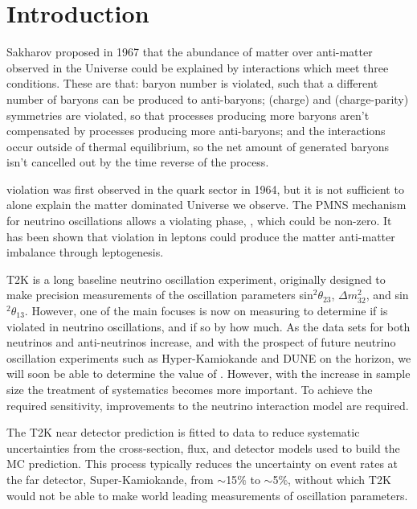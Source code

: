 \chapter{Introduction} \label{sec:introductions}

Sakharov proposed in 1967\cite{sakharov} that the abundance of matter over anti-matter observed in the Universe could be explained by interactions which meet three conditions. These are that: baryon number is violated, such that a different number of baryons can be produced to anti-baryons; \C (charge) and \CP (charge-parity) symmetries are violated, so that processes producing more baryons aren't compensated by processes producing more anti-baryons; and the interactions occur outside of thermal equilibrium, so the net amount of generated baryons isn't cancelled out by the time reverse of the process. 

\CP violation was first observed in the quark sector in 1964\cite{quarkcpv}, but it is not sufficient to alone explain the matter dominated Universe we observe. The PMNS mechanism for neutrino oscillations allows a \CP violating phase, \deltacp, which could be non-zero. It has been shown that \CP violation in leptons could produce the matter anti-matter imbalance through leptogenesis\cite{leptogenesis}. 

T2K \cite{PhysRevLett.121.171802} is a long baseline neutrino oscillation experiment, originally designed to make precision measurements of the oscillation parameters sin$^2\theta_{23}$, $\Delta m^2_{32}$, and sin$^2\theta_{13}$. However, one of the main focuses is now on measuring \deltacp to determine if \CP is violated in neutrino oscillations, and if so by how much. As the data sets for both neutrinos and anti-neutrinos increase, and with the prospect of future neutrino oscillation experiments such as Hyper-Kamiokande \cite{Abe:2018uyc} and DUNE \cite{acciarri2016longbaseline} on the horizon, we will soon be able to determine the value of \deltacp. However, with the increase in sample size the treatment of systematics becomes more important. To achieve the required sensitivity, improvements to the neutrino interaction model are required.

The T2K near detector prediction is fitted to data to reduce systematic uncertainties from the cross-section, flux, and detector models used to build the MC prediction. This process typically reduces the uncertainty on event rates at the far detector, Super-Kamiokande, from $\sim$15$\%$ to $\sim$5$\%$, without which T2K would not be able to make world leading measurements of oscillation parameters.

